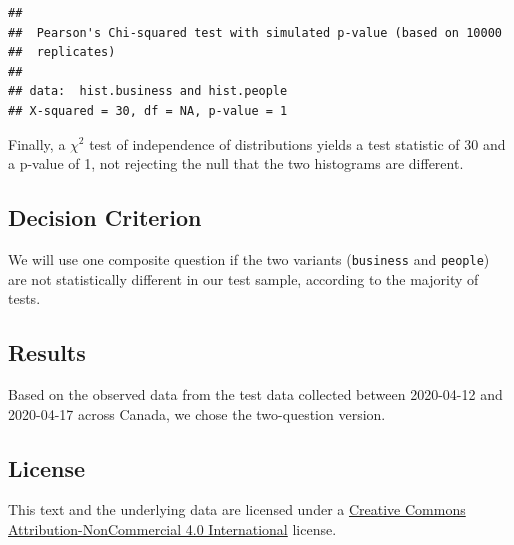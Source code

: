 \documentclass[
]{article}
\begin{document}
\begin{verbatim}
## 
##  Pearson's Chi-squared test with simulated p-value (based on 10000
##  replicates)
## 
## data:  hist.business and hist.people
## X-squared = 30, df = NA, p-value = 1
\end{verbatim}

Finally, a \(\chi^2\) test of independence of distributions yields a
test statistic of 30 and a p-value of 1, not rejecting the null that the
two histograms are different.

\hypertarget{decision-criterion}{%
\subsection{Decision Criterion}\label{decision-criterion}}

We will use one composite question if the two variants
(\texttt{business} and \texttt{people}) are not statistically different
in our test sample, according to the majority of tests.

\hypertarget{results}{%
\subsection{Results}\label{results}}

Based on the observed data from the test data collected between
2020-04-12 and 2020-04-17 across Canada, we chose the two-question
version.

\hypertarget{license}{%
\subsection{License}\label{license}}

This text and the underlying data are licensed under a
\href{https://creativecommons.org/licenses/by-nc/4.0/}{Creative Commons
Attribution-NonCommercial 4.0 International} license.
\end{document}
